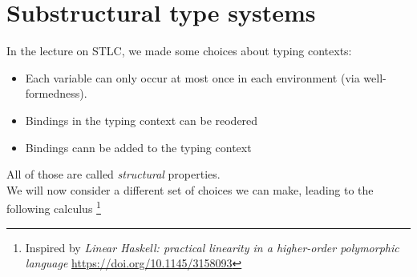 \section{Substructural type systems}
In the lecture on STLC, we made some choices about typing contexts:
\begin{itemize}
  \item Each variable can only occur at most once in each environment (via well-formedness).
  \item Bindings in the typing context can be reodered
  \item Bindings cann be added to the typing context
\end{itemize}
All of those are called \emph{structural} properties.\\
We will now consider a different set of choices we can make, leading to the following calculus
\footnote{Inspired by \emph{Linear Haskell: practical linearity in a higher-order polymorphic language} \url{https://doi.org/10.1145/3158093}}
